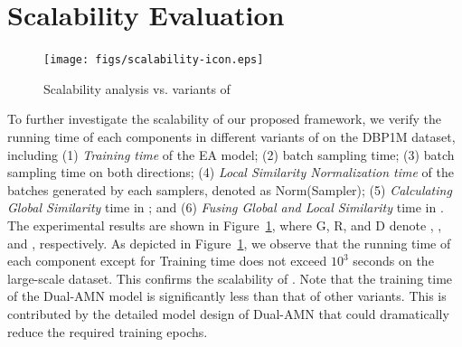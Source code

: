 \section{Scalability Evaluation}
\label{app:scalability}

\begin{figure}[t]
\centering
\texttt{[image: figs/scalability-icon.eps]}\vspace*{-4.5mm}\\
\caption{Scalability analysis vs. variants of \ClusterEA{}}
\label{fig:scalability}
\end{figure}
To further investigate the scalability of our proposed \ClusterEA{} framework, we verify the running time of each components in different variants of \ClusterEA{} on the DBP1M dataset, including (1) \emph{Training time} of the EA model; (2) \emph{\KMeans{}} batch sampling time; (3) \emph{\MetisGCN{}} batch sampling time on both directions; (4) \emph{Local Similarity Normalization time} of the batches generated by each samplers, denoted as Norm(Sampler); (5) \emph{Calculating Global Similarity} time in \Merging{}; and (6) \emph{Fusing Global and Local Similarity} time in \Merging{}. 
The experimental results are shown in Figure~\ref{fig:scalability}, where G, R, and D denote , , and , respectively. As depicted in Figure~\ref{fig:scalability}, we observe that the running time of each component except for Training time does not exceed $10^3$ seconds on the large-scale dataset.
This confirms the scalability of \ClusterEA{}. Note that the training time of the Dual-AMN model is significantly less than that of other variants. This is contributed by the detailed model design of Dual-AMN that could dramatically reduce the required training epochs.
